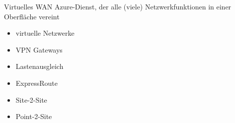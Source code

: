 \begin{flashcard}[Definition]{Virtuelles WAN}
    Azure-Dienst, der alle (viele) Netzwerkfunktionen in einer Oberfläche vereint
    \begin{itemize}
        \item virtuelle Netzwerke
        \item VPN Gateways
        \item Lastenausgleich
        \item ExpressRoute
        \item Site-2-Site
        \item Point-2-Site
    \end{itemize}
\end{flashcard}


